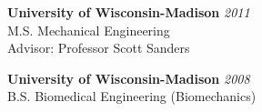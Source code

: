 \documentclass[11pt,letterpaper]{article}
\begin{document}
\vspace{3mm}
\begin{minipage}{0.45\columnwidth}
{\bf University of Wisconsin-Madison} \hfill {\em2011} \\ 
\hspace{5mm} M.S. Mechanical Engineering \\
\hspace{10mm} Advisor: Professor Scott Sanders\\
\end{minipage}%
\hfill
\begin{minipage}{0.5\columnwidth}
{\bf University of Wisconsin-Madison} \hfill {\em2008} \\ 
\hspace{5mm}B.S. Biomedical Engineering (Biomechanics)
\end{minipage}
\end{document}
